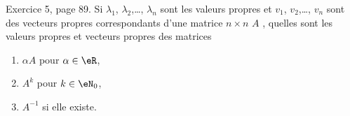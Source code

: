 \begin{exercice}\label{exoLineraire0033}

	Exercice 5, page 89. Si $\lambda_1$, $\lambda_2$,\ldots, $\lambda_n$ sont les valeurs propres et $v_1$, $v_2$,\ldots, $v_n$ sont des vecteurs propres correspondants d'une matrice $n\times n$ $A$ , quelles sont les valeurs propres et vecteurs propres des matrices
	\begin{enumerate}

		\item
			$\alpha A$ pour $\alpha\in\eR$,

		\item
			$A^k$ pour $k\in\eN_{0}$,

		\item
			$A^{-1}$ si elle existe.

	\end{enumerate}

\end{exercice}
